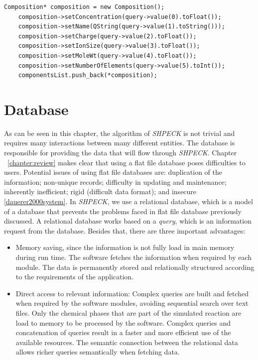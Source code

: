 \begin{minipage}{0.8\linewidth}
\begin{lstlisting}[frame=single, label=cod:waterMethodSavingComponent, caption=Detailed composition of the water]
    Composition* composition = new Composition();
    composition->setConcentration(query->value(0).toFloat());
    composition->setName(QString(query->value(1).toString()));
    composition->setCharge(query->value(2).toFloat());
    composition->setIonSize(query->value(3).toFloat());
    composition->setMoleWt(query->value(4).toFloat());
    composition->setNumberOfElements(query->value(5).toInt());
    componentsList.push_back(*composition);
\end{lstlisting}
\end{minipage}

\section{Database}
As can be seen in this chapter, the algorithm of \emph{SHPECK} is not trivial and requires many interactions between many different entities. The database is responsible for providing the data that will flow through \emph{SHPECK}. Chapter ~\ref{chapter:review} makes clear that using a flat file database poses difficulties to users. Potential issues of using flat file databases are: duplication of the information; non-unique records; difficulty in updating and maintenance; inherently inefficient; rigid (difficult data format); and insecure \ref{dauerer2000system}. 
In \emph{SHPECK}, we use a relational database, which is a model of a database that prevents the problems faced in flat file database previously discussed. A relational database works based on a \emph{query}, which is an information request from the database. Besides that, there are three important advantages:
\begin{itemize}
\item Memory saving, since the information is not fully load in main memory during run time. The software fetches the information when required by each module. The data is permanently stored and relationally structured according to the requirements of the application.
\item Direct access to relevant information: Complex queries are built and fetched when required by the software modules, avoiding sequential search over text files.  Only the chemical phases that are part of the simulated reaction are load to memory to be processed by the software. Complex queries and concatenation of queries result in a faster and more efficient use of the available resources. The semantic connection between the relational data allows richer queries semantically when fetching data.
\end{itemize}

